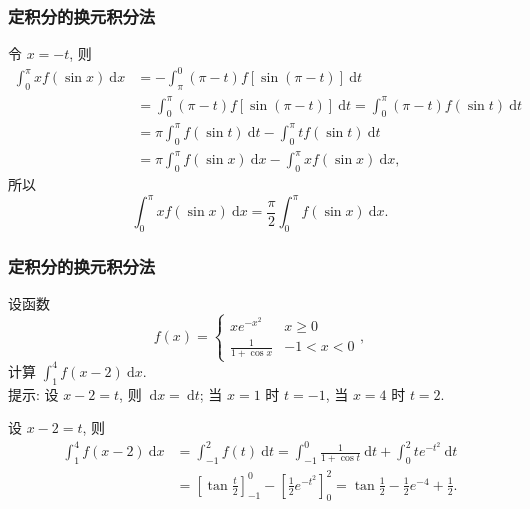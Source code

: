 \documentclass[
10pt,
aspectratio=43,
]{beamer}
\begin{document}
\begin{frame}
	\frametitle{定积分的换元积分法}
	\everymath{\displaystyle}
	\begin{exampleblock}{}
		令 $x=-t$, 则
		$$
			\begin{aligned}
				\int_0^\pi x f(\sin x) \mathrm{~d} x & =-\int_\pi^0(\pi-t) f[\sin (\pi-t)] \mathrm{~d} t                                          \\
				                                     & =\int_0^\pi(\pi-t) f[\sin (\pi-t)] \mathrm{~d} t=\int_0^\pi(\pi-t) f(\sin t) \mathrm{~d} t \\
				                                     & =\pi \int_0^\pi f(\sin t) \mathrm{~d} t-\int_0^\pi t f(\sin t) \mathrm{~d} t               \\
				                                     & =\pi \int_0^\pi f(\sin x) \mathrm{~d} x-\int_0^\pi x f(\sin x) \mathrm{~d} x,
			\end{aligned}
		$$
		所以
		$$
			\int_0^\pi x f(\sin x) \mathrm{~d} x=\frac{\pi}{2} \int_0^\pi f(\sin x) \mathrm{~d} x.
		$$
	\end{exampleblock}
\end{frame}

\begin{frame}
	\frametitle{定积分的换元积分法}
	\everymath{\displaystyle}
	\begin{block}{}
		设函数
		$$
			f(x)=\left\{\begin{array}{cc}x e^{-x^2} & x \geq 0 \\ \frac{1}{1+\cos x} & -1<x<0\end{array}\right.,
		$$
		计算 $\int_1^4 f(x-2) \mathrm{~d} x$.\\\vspace{0.2cm}
		提示: 设 $x-2=t$, 则 $\mathrm{~d} x=\mathrm{~d} t$; 当 $x=1$ 时 $t=-1$, 当 $x=4$ 时 $t=2$.
	\end{block}
	\pause
	\begin{exampleblock}{}
		设 $x-2=t$, 则
		$$
			\begin{aligned}
				\int_1^4 f(x-2) \mathrm{~d} x & =\int_{-1}^2 f(t) \mathrm{~d} t=\int_{-1}^0 \frac{1}{1+\cos t} \mathrm{~d} t+\int_0^2 t e^{-t^2} \mathrm{~d} t                \\
				                              & =\left[\tan \frac{t}{2}\right]_{-1}^0-\left[\frac{1}{2} e^{-t^2}\right]_0^2=\tan \frac{1}{2}-\frac{1}{2} e^{-4}+\frac{1}{2} .
			\end{aligned}
		$$
	\end{exampleblock}
\end{frame}
\end{document}
